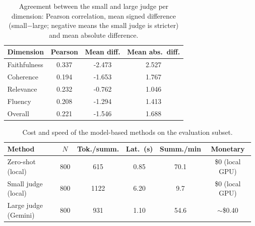 \begin{table}[t]
\centering
\caption{Agreement between the small and large judge per dimension: Pearson correlation, mean signed difference (small$-$large; negative means the small judge is stricter) and mean absolute difference.}
\label{tab:agreement}
\begin{tabular}{lccc}
\toprule
Dimension & Pearson & Mean diff. & Mean abs.\ diff. \\
\midrule
Faithfulness & 0.337 & -2.473 & 2.527 \\
Coherence & 0.194 & -1.653 & 1.767 \\
Relevance & 0.232 & -0.762 & 1.046 \\
Fluency & 0.208 & -1.294 & 1.413 \\
Overall & 0.221 & -1.546 & 1.688 \\
\bottomrule
\end{tabular}
\end{table}

\begin{table}[t]
\centering
\caption{Cost and speed of the model-based methods on the evaluation subset.}
\label{tab:cost}
\begin{tabular}{lccccc}
\toprule
Method & $N$ & Tok./summ. & Lat.\ (s) & Summ./min & Monetary \\
\midrule
Zero-shot (local) & 800 & 615 & 0.85 & 70.1 & \$0 (local GPU) \\
Small judge (local) & 800 & 1122 & 6.20 & 9.7 & \$0 (local GPU) \\
Large judge (Gemini) & 800 & 931 & 1.10 & 54.6 & $\sim$\$0.40 \\
\bottomrule
\end{tabular}
\end{table}
